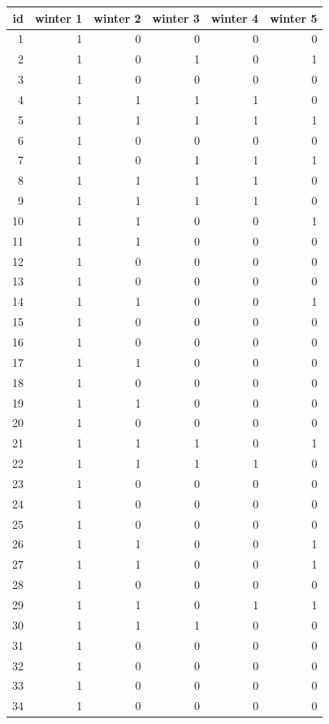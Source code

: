 \documentclass[
  12pt,
]{krantz}
\begin{document}
\begin{tabular}{r|r|r|r|r|r}
\hline
id & winter 1 & winter 2 & winter 3 & winter 4 & winter 5\\
\hline
1 & 1 & 0 & 0 & 0 & 0\\
\hline
2 & 1 & 0 & 1 & 0 & 1\\
\hline
3 & 1 & 0 & 0 & 0 & 0\\
\hline
4 & 1 & 1 & 1 & 1 & 0\\
\hline
5 & 1 & 1 & 1 & 1 & 1\\
\hline
6 & 1 & 0 & 0 & 0 & 0\\
\hline
7 & 1 & 0 & 1 & 1 & 1\\
\hline
8 & 1 & 1 & 1 & 1 & 0\\
\hline
9 & 1 & 1 & 1 & 1 & 0\\
\hline
10 & 1 & 1 & 0 & 0 & 1\\
\hline
11 & 1 & 1 & 0 & 0 & 0\\
\hline
12 & 1 & 0 & 0 & 0 & 0\\
\hline
13 & 1 & 0 & 0 & 0 & 0\\
\hline
14 & 1 & 1 & 0 & 0 & 1\\
\hline
15 & 1 & 0 & 0 & 0 & 0\\
\hline
16 & 1 & 0 & 0 & 0 & 0\\
\hline
17 & 1 & 1 & 0 & 0 & 0\\
\hline
18 & 1 & 0 & 0 & 0 & 0\\
\hline
19 & 1 & 1 & 0 & 0 & 0\\
\hline
20 & 1 & 0 & 0 & 0 & 0\\
\hline
21 & 1 & 1 & 1 & 0 & 1\\
\hline
22 & 1 & 1 & 1 & 1 & 0\\
\hline
23 & 1 & 0 & 0 & 0 & 0\\
\hline
24 & 1 & 0 & 0 & 0 & 0\\
\hline
25 & 1 & 0 & 0 & 0 & 0\\
\hline
26 & 1 & 1 & 0 & 0 & 1\\
\hline
27 & 1 & 1 & 0 & 0 & 1\\
\hline
28 & 1 & 0 & 0 & 0 & 0\\
\hline
29 & 1 & 1 & 0 & 1 & 1\\
\hline
30 & 1 & 1 & 1 & 0 & 0\\
\hline
31 & 1 & 0 & 0 & 0 & 0\\
\hline
32 & 1 & 0 & 0 & 0 & 0\\
\hline
33 & 1 & 0 & 0 & 0 & 0\\
\hline
34 & 1 & 0 & 0 & 0 & 0\\

\end{tabular}
\end{document}
